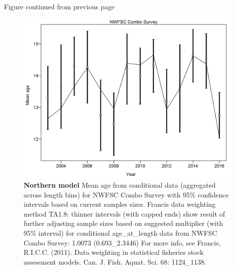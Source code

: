 \documentclass[12pt,]{article}
\begin{document}
\begin{center} 

            Figure continued from previous page 

            \end{center}

\begin{figure}[htbp]
\centering
\includegraphics{./r4ss/plots_mod1/comp_condAALfit_data_weighting_TA1.8_condAgeNWFSC Combo Survey.png}
\caption{\textbf{Northern model} Mean age from conditional data
(aggregated across length bins) for NWFSC Combo Survey with 95\%
confidence intervals based on current samples sizes. Francis data
weighting method TA1.8: thinner intervals (with capped ends) show result
of further adjusting sample sizes based on suggested multiplier (with
95\% interval) for conditional age\_at\_length data from NWFSC Combo
Survey: 1.0073 (0.693\_2.3446) For more info, see Francis, R.I.C.C.
(2011). Data weighting in statistical fisheries stock assessment models.
Can. J. Fish. Aquat. Sci. 68: 1124\_1138.
\label{fig:mod1_3_comp_condAALfit_data_weighting_TA1.8_condAgeNWFSC Combo Survey}}
\end{figure}
\end{document}
